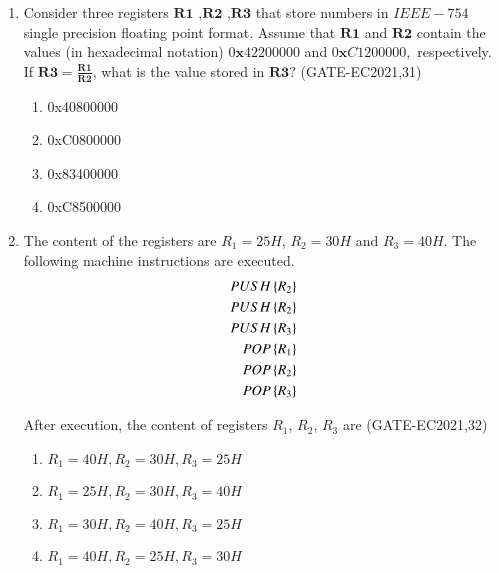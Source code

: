 \begin{enumerate}[label=\arabic*.,ref=\theenumi]
\item Consider three registers $\textbf{R1 ,R2 ,R3}$ that store numbers in $ IEEE-754 $ single precision floating point format. Assume that $\textbf{R1}$ and $\textbf{R2}$ contain the values (in hexadecimal notation) $0\textbf{x}42200000$ and $0\textbf{x}C1200000,$ respectively. If $ \textbf{R3}=\frac{\textbf{R1}}{\textbf{R2}} $, what is the value stored in $\textbf{R3}?$
\hfill(GATE-EC2021,31)
\begin{enumerate}
    \item 0x40800000
    \item 0xC0800000
    \item 0x83400000
    \item 0xC8500000
\end{enumerate}

\item The content of the registers are $R_1 = 25H$, $R_2 = 30H$ and $R_3 = 40H$. The following machine instructions are executed.
\begin{align*}
  PUSH \left\{R_2\right\}  
  \\PUSH \left\{R_2\right\}
  \\PUSH \left\{R_3\right\} 
  \\POP \left\{R_1\right\} 
  \\POP \left\{R_2\right\} 
  \\POP \left\{R_3\right\} 
\end{align*}

After execution, the content of registers $R_1$, $R_2$, $R_3$ are
\hfill(GATE-EC2021,32)

\begin{enumerate}
    \item $R_1 = 40H, R_2 = 30H,R_3 = 25H$
    \item $R_1 = 25H, R_2 = 30H,R_3 = 40H$
    \item $R_1 = 30H, R_2 = 40H,R_3 = 25H$
    \item $R_1 = 40H, R_2 = 25H,R_3 = 30H$
\end{enumerate}



\end{enumerate}
